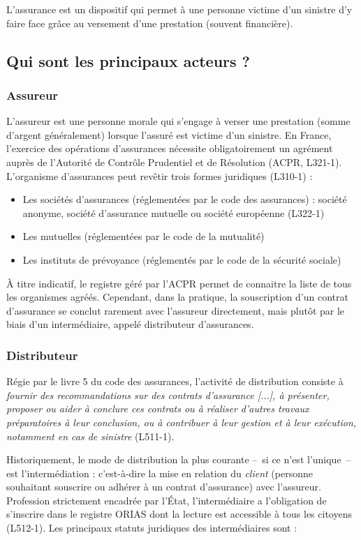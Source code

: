 \documentclass{article}
\begin{document}
L'assurance est un dispositif qui permet à une personne victime d'un sinistre d'y faire face grâce au versement d'une prestation (souvent financière).

\subsection{Qui sont les principaux acteurs ?}
\subsubsection{Assureur}
L'assureur est une personne morale qui s'engage à verser une prestation (somme d'argent généralement) lorsque l'assuré est victime d'un sinistre. En France, l'exercice des opérations d'assurances nécessite obligatoirement un agrément auprès de l'Autorité de Contrôle Prudentiel et de Résolution (ACPR, L321-1). L'organisme d'assurances peut revêtir trois formes juridiques (L310-1) :
\begin{itemize}
    \item Les sociétés d'assurances (réglementées par le code des assurances) :  société anonyme, société d'assurance mutuelle ou société européenne (L322-1)
    \item Les mutuelles (réglementées par le code de la mutualité)
    \item Les instituts de prévoyance (réglementés par le code de la sécurité sociale)
\end{itemize}

À titre indicatif, le registre géré par l'ACPR permet de connaitre la liste de tous les organismes agréés. Cependant, dans la pratique, la souscription d'un contrat d'assurance se conclut rarement avec l'assureur directement, mais plutôt par le biais d'un intermédiaire, appelé distributeur d'assurances.

\subsubsection{Distributeur}
Régie par le livre 5 du code des assurances, l'activité de distribution consiste à \textit{fournir des recommandations sur des contrats d'assurance [...], à présenter, proposer ou aider à conclure ces contrats ou à réaliser d'autres travaux préparatoires à leur conclusion, ou à contribuer à leur gestion et à leur exécution, notamment en cas de sinistre} (L511-1).

Historiquement, le mode de distribution la plus courante --~si ce n'est l'unique~-- est l'intermédiation : c'est-à-dire la mise en relation du \textit{client} (personne souhaitant souscrire ou adhérer à un contrat d'assurance) avec l'assureur. Profession strictement encadrée par l'État, l'intermédiaire a l'obligation de s'inscrire dans le registre ORIAS dont la lecture est accessible à tous les citoyens (L512-1). Les principaux statuts juridiques des intermédiaires sont :
\end{document}
